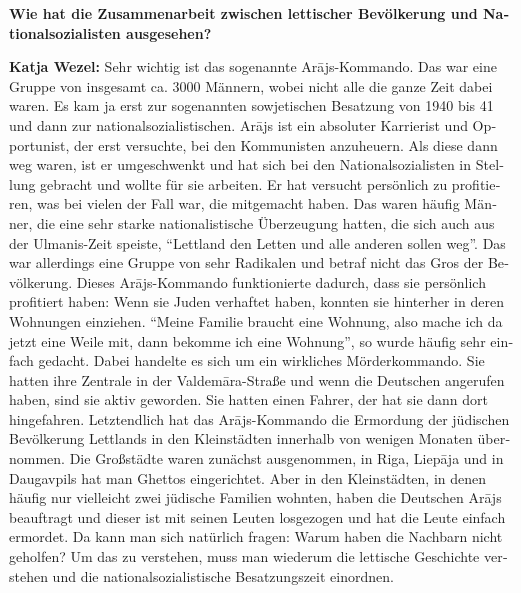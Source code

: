 \begin{otherlanguage}{ngerman}
\textbf{Wie hat die Zusammenarbeit zwischen lettischer Bevölkerung und Nationalsozialisten ausgesehen?} 

\textbf{Katja Wezel:} Sehr wichtig ist das sogenannte Arājs-Kommando. Das war eine Gruppe von insgesamt ca. 3000 Männern, wobei nicht alle die ganze Zeit dabei waren. Es kam ja erst zur sogenannten sowjetischen Besatzung von 1940 bis 41 und dann zur nationalsozialistischen. Arājs ist ein absoluter Karrierist und Opportunist, der erst versuchte, bei den Kommunisten anzuheuern. Als diese dann weg waren, ist er umgeschwenkt und hat sich bei den Nationalsozialisten in Stellung gebracht und wollte für sie arbeiten. Er hat versucht persönlich zu profitieren, was bei vielen der Fall war, die mitgemacht haben. Das waren häufig Männer, die eine sehr starke nationalistische Überzeugung hatten, die sich auch aus der Ulmanis-Zeit speiste, "`Lettland den Letten und alle anderen sollen weg"'. Das war allerdings eine Gruppe von sehr Radikalen und betraf nicht das Gros der Bevölkerung. Dieses Arājs-Kommando funktionierte dadurch, dass sie persönlich profitiert haben: Wenn sie Juden verhaftet haben, konnten sie hinterher in deren Wohnungen einziehen. "`Meine Familie braucht eine Wohnung, also mache ich da jetzt eine Weile mit, dann bekomme ich eine Wohnung"', so wurde häufig sehr einfach gedacht. Dabei handelte es sich um ein wirkliches Mörderkommando. Sie hatten ihre Zentrale in der Valdemāra-Straße und wenn die Deutschen angerufen haben, sind sie aktiv geworden. Sie hatten einen Fahrer, der hat sie dann dort hingefahren. Letztendlich hat das Arājs-Kommando die Ermordung der jüdischen Bevölkerung Lettlands in den Kleinstädten innerhalb von wenigen Monaten übernommen. Die Großstädte waren zunächst ausgenommen, in Riga, Liepāja und in Daugavpils hat man Ghettos eingerichtet. Aber in den Kleinstädten, in denen häufig nur vielleicht zwei jüdische Familien wohnten, haben die Deutschen Arājs beauftragt und dieser ist mit seinen Leuten losgezogen und hat die Leute einfach ermordet. Da kann man sich natürlich fragen: Warum haben die Nachbarn nicht geholfen? Um das zu verstehen, muss man wiederum die lettische Geschichte verstehen und die nationalsozialistische Besatzungszeit einordnen.\\

\end{otherlanguage}
